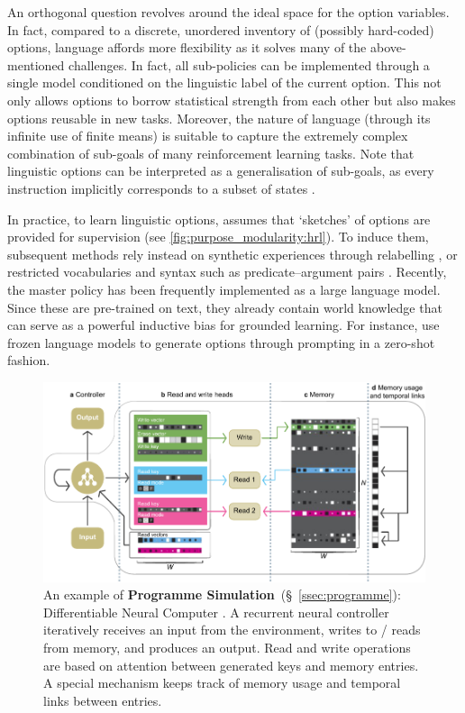 \documentclass[10pt]{article} %
\begin{document}
An orthogonal question revolves around the ideal space for the option variables. In fact, compared to a discrete, unordered inventory of (possibly hard-coded) options, language affords more flexibility \citep{andreas2017modular,jiang2019language} as it solves many of the above-mentioned challenges. In fact, all sub-policies can be implemented through a single model conditioned on the linguistic label of the current option. This not only allows options to borrow statistical strength from each other but also makes options reusable in new tasks.
Moreover, the nature of language (through its infinite use of finite means) is suitable to capture the extremely complex combination of sub-goals of many reinforcement learning tasks. Note that linguistic options can be interpreted as a generalisation of sub-goals, as every instruction implicitly corresponds to a subset of states \citep{jiang2019language}.

In practice, to learn linguistic options,
\citet{andreas2017modular} assumes that `sketches' of options are provided for supervision (see \cref{fig:purpose_modularity:hrl}). To induce them, subsequent methods rely instead on synthetic experiences through relabelling
\citep{jiang2019language}, or restricted vocabularies and syntax such as predicate--argument pairs \citep{das2018neural}. Recently, the master policy has been frequently implemented as a large language model. Since these are pre-trained on text, they already contain world knowledge that can serve as a powerful inductive bias for grounded learning. For instance, \citet{huang2022language} use frozen language models to generate options through prompting in a zero-shot fashion.

 \begin{figure}[t]
    \centering
    \vspace{3em}
        \includegraphics[width=.7\linewidth]{img/schema_programme}
        \caption{An example of \textbf{Programme Simulation}~(\S~\ref{ssec:programme}): Differentiable Neural Computer \citep{graves2016hybrid}. A recurrent neural controller iteratively receives an input from the environment, writes to / reads from memory, and produces an output. Read and write operations are based on attention between generated keys and memory entries. A special mechanism keeps track of memory usage and temporal links between entries.}
    \label{fig:purpose_modularity:programme}
    \end{figure}
\end{document}
